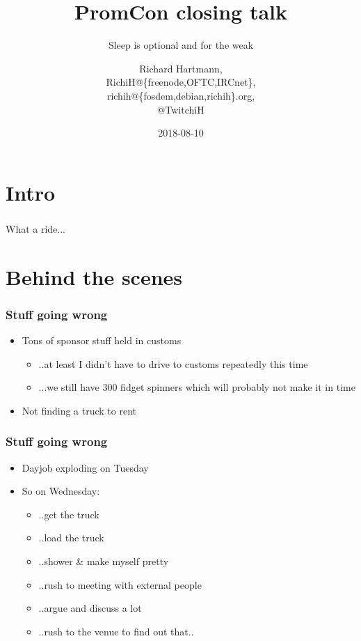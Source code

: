 \documentclass[t]{beamer}
\title{PromCon closing talk}
\subtitle{Sleep is optional and for the weak}
\author{Richard Hartmann,\\
RichiH@\{freenode,OFTC,IRCnet\},\\
richih@\{fosdem,debian,richih\}.org, \\
@TwitchiH}
\date{2018-08-10}
\begin{document}
\setcounter{tocdepth}{1}

\begin{frame}
	\titlepage
\end{frame}




\section{Intro}

\begin{frame}
	\frametitle{}
	\begin{center}
	\vfill
	What a ride...
	\vfill
	\end{center}
\end{frame}


\section{Behind the scenes}

\begin{frame}
	\frametitle{Stuff going wrong}
	\vfill
	\begin{itemize}
		\item Tons of sponsor stuff held in customs
		\begin{itemize}
			\item ..at least I didn't have to drive to customs repeatedly this time
			\item ...we still have 300 fidget spinners which will probably not make it in time
		\end{itemize}
		\item Not finding a truck to rent
	\end{itemize}
	\vfill
\end{frame}

\begin{frame}
	\frametitle{Stuff going wrong}
	\vfill
		\begin{itemize}
		\item Dayjob exploding on Tuesday
		\item So on Wednesday:
		\begin{itemize}
			\item ..get the truck
			\item ..load the truck
			\item ..shower \& make myself pretty
			\item ..rush to meeting with external people
			\item ..argue and discuss a lot
			\item ..rush to the venue to find out that..
		\end{itemize}
	\end{itemize}
	\vfill
\end{frame}
\end{document}

